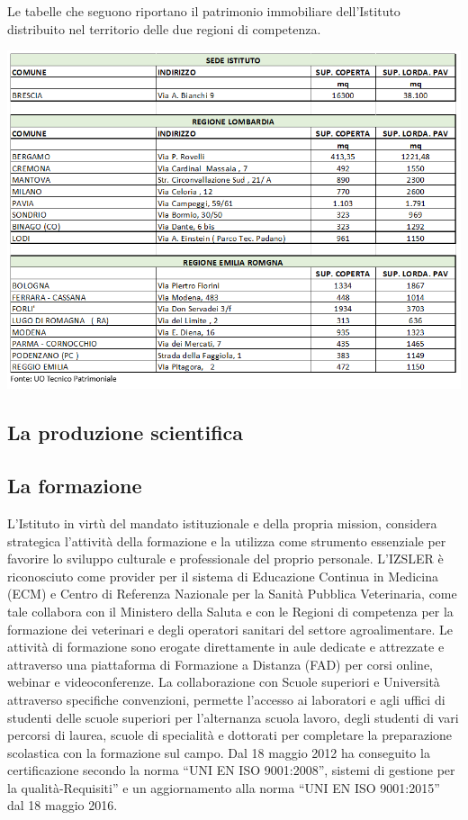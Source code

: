 \documentclass[
  12pt,
]{article}
\begin{document}
Le tabelle che seguono riportano il patrimonio immobiliare dell'Istituto
distribuito nel territorio delle due regioni di competenza.

\begin{center}\includegraphics[width=0.9\linewidth]{figure/imm} \end{center}

\hypertarget{la-produzione-scientifica}{%
\subsection{La produzione scientifica}\label{la-produzione-scientifica}}

\hypertarget{la-formazione}{%
\subsection{La formazione}\label{la-formazione}}

L'Istituto in virtù del mandato istituzionale e della propria mission,
considera strategica l'attività della formazione e la utilizza come
strumento essenziale per favorire lo sviluppo culturale e professionale
del proprio personale. L'IZSLER è riconosciuto come provider per il
sistema di Educazione Continua in Medicina (ECM) e Centro di Referenza
Nazionale per la Sanità Pubblica Veterinaria, come tale collabora con il
Ministero della Saluta e con le Regioni di competenza per la formazione
dei veterinari e degli operatori sanitari del settore agroalimentare. Le
attività di formazione sono erogate direttamente in aule dedicate e
attrezzate e attraverso una piattaforma di Formazione a Distanza (FAD)
per corsi online, webinar e videoconferenze. La collaborazione con
Scuole superiori e Università attraverso specifiche convenzioni,
permette l'accesso ai laboratori e agli uffici di studenti delle scuole
superiori per l'alternanza scuola lavoro, degli studenti di vari
percorsi di laurea, scuole di specialità e dottorati per completare la
preparazione scolastica con la formazione sul campo. Dal 18 maggio 2012
ha conseguito la certificazione secondo la norma ``UNI EN ISO
9001:2008'', sistemi di gestione per la qualità-Requisiti'' e un
aggiornamento alla norma ``UNI EN ISO 9001:2015'' dal 18 maggio 2016.
\end{document}
